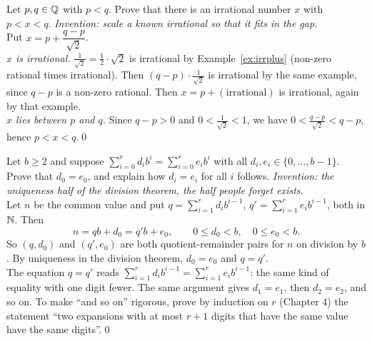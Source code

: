 \begin{bexample}
Let $p,q\in\mathbb{Q}$ with $p<q$. Prove that there is an irrational number $x$ with $p<x<q$.
\solution
\emph{Invention: scale a known irrational so that it fits in the gap.}\\
Put $x=p+\dfrac{q-p}{\sqrt2}$.\\
\emph{$x$ is irrational.} $\frac1{\sqrt2}=\frac12\cdot\sqrt2$ is irrational by Example~\ref{ex:irrplus} (non-zero rational times irrational). Then $(q-p)\cdot\frac1{\sqrt2}$ is irrational by the same example, since $q-p$ is a non-zero rational. Then $x=p+(\text{irrational})$ is irrational, again by that example.\\
\emph{$x$ lies between $p$ and $q$.} Since $q-p>0$ and $0<\frac1{\sqrt2}<1$, we have $0<\frac{q-p}{\sqrt2}<q-p$, hence $p<x<q$.\qed
\end{bexample}

\begin{bexample}
Let $b\ge2$ and suppose $\sum_{i=0}^rd_ib^i=\sum_{i=0}^re_ib^i$ with all $d_i,e_i\in\{0,\dots,b-1\}$. Prove that $d_0=e_0$, and explain how $d_i=e_i$ for all $i$ follows.
\solution
\emph{Invention: the uniqueness half of the division theorem, the half people forget exists.}\\
Let $n$ be the common value and put $q=\sum_{i=1}^rd_ib^{i-1}$, $q'=\sum_{i=1}^re_ib^{i-1}$, both in $\mathbb{N}$. Then
\[
n=qb+d_0=q'b+e_0,\qquad 0\le d_0<b,\quad 0\le e_0<b .
\]
So $(q,d_0)$ and $(q',e_0)$ are both quotient-remainder pairs for $n$ on division by $b$. By uniqueness in the division theorem, $d_0=e_0$ and $q=q'$.\\
The equation $q=q'$ reads $\sum_{i=1}^rd_ib^{i-1}=\sum_{i=1}^re_ib^{i-1}$: the same kind of equality with one digit fewer. The same argument gives $d_1=e_1$, then $d_2=e_2$, and so on. To make ``and so on'' rigorous, prove by induction on $r$ (Chapter 4) the statement ``two expansions with at most $r+1$ digits that have the same value have the same digits''.\qed
\end{bexample}

